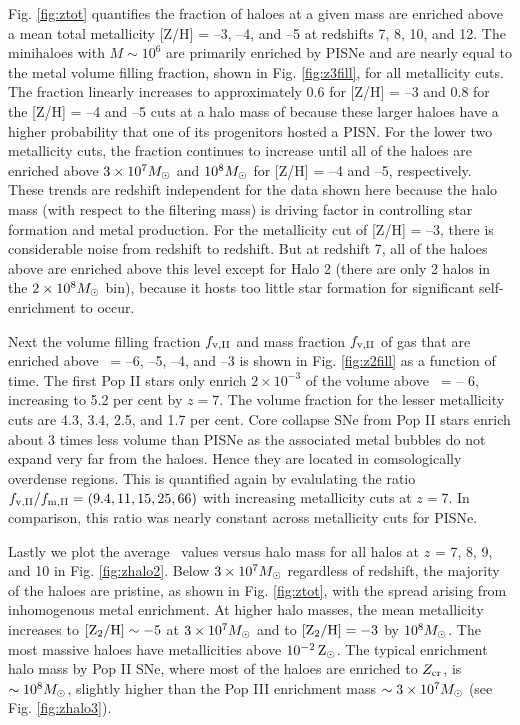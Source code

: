 \documentclass[useAMS,usenatbib]{mn2e}
\begin{document}
Fig. \ref{fig:ztot} quantifies the fraction of haloes at a given mass
are enriched above a mean total metallicity [Z/H] = --3, --4, and --5
at redshifts 7, 8, 10, and 12.  The minihaloes with $M \sim 10^6$ are
primarily enriched by PISNe and are nearly equal to the metal volume
filling fraction, shown in Fig. \ref{fig:z3fill}, for all metallicity
cuts.  The fraction linearly increases to approximately 0.6 for [Z/H]
= --3 and 0.8 for the [Z/H] = --4 and --5 cuts at a halo mass of
\Ms because these larger haloes have a higher probability
that one of its progenitors hosted a PISN.  For the lower two
metallicity cuts, the fraction continues to increase until all of the
haloes are enriched above $3 \times 10^7 \Ms$ and $10^8 \Ms$ for [Z/H]
= --4 and --5, respectively.  These trends are redshift independent
for the data shown here because the halo mass (with respect to the
filtering mass) is driving factor in controlling star formation and
metal production.  For the metallicity cut of [Z/H] = --3, there is
considerable noise from redshift to redshift.  But at redshift 7, all
of the haloes above \Ms are enriched above this level except
for Halo 2 (there are only 2 halos in the $2 \times 10^8 \Ms$ bin),
because it hosts too little star formation for significant
self-enrichment to occur.

Next the volume filling fraction $f_{\rm v,II}$ and mass fraction
$f_{\rm v,II}$ of gas that are enriched above \ztwo~= --6, --5, --4,
and --3 is shown in Fig. \ref{fig:z2fill} as a function of time.  The
first Pop II stars only enrich $2 \times 10^{-3}$ of the volume above
\ztwo~= -- 6, increasing to 5.2 per cent by $z=7$.  The volume
fraction for the lesser metallicity cuts are 4.3, 3.4, 2.5, and 1.7
per cent.  Core collapse SNe from Pop II stars enrich about 3 times
less volume than PISNe as the associated metal bubbles do not expand
very far from the haloes.  Hence they are located in comsologically
overdense regions.  This is quantified again by evalulating the ratio
$f_{\rm v,II}/f_{\rm m,II} = (9.4, 11, 15, 25, 66)$ with increasing
metallicity cuts at $z=7$.  In comparison, this ratio was nearly
constant across metallicity cuts for PISNe.

Lastly we plot the average \ztwo~values versus halo mass for all halos
at $z$ = 7, 8, 9, and 10 in Fig. \ref{fig:zhalo2}.  Below $3 \times
10^7 \Ms$ regardless of redshift, the majority of the haloes are
pristine, as shown in Fig. \ref{fig:ztot}, with the spread arising
from inhomogenous metal enrichment.  At higher halo masses, the mean
metallicity increases to $\ztwo \sim -5$ at $3 \times 10^7 \Ms$ and to
$\ztwo = -3$ by $10^8 \Ms$.  The most massive haloes have
metallicities above $10^{-2} {\rm\,Z_\odot}$.  The typical enrichment halo mass
by Pop II SNe, where most of the haloes are enriched to $Z_{\rm cr}$,
is $\sim 10^8 \Ms$, slightly higher than the Pop III enrichment mass
$\sim 3 \times 10^7 \Ms$ (see Fig. \ref{fig:zhalo3}).
\end{document}

